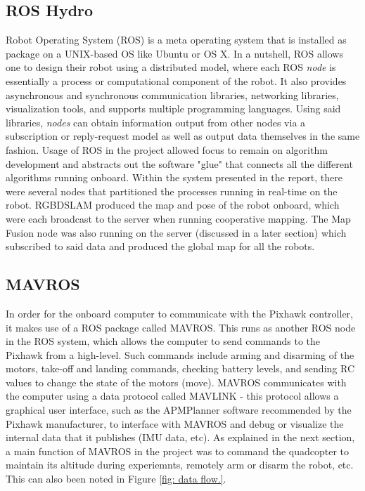 \documentclass[letterpaper, oneside, 10pt]{report}
\begin{document}
\subsection{ROS Hydro}
Robot Operating System (ROS) is a meta operating system that is installed as package on a UNIX-based OS like Ubuntu or OS X. In a nutshell, ROS allows one to design their robot using a distributed model, where each ROS \textsl{node} is essentially a process or computational component of the robot. It also provides asynchronous and synchronous communication libraries, networking libraries, visualization tools, and supports multiple programming languages. Using said libraries, \textsl{nodes} can obtain information output from other nodes via a subscription or reply-request model as well as output data themselves in the same fashion. Usage of ROS in the project allowed focus to remain on algorithm development and abstracts out the software "glue" that connects all the different algorithms running onboard. Within the system presented in the report, there were several nodes that partitioned the processes running in real-time on the robot. RGBDSLAM produced the map and pose of the robot onboard, which were each broadcast to the server when running cooperative mapping. The Map Fusion node was also running on the server (discussed in a later section) which subscribed to said data and produced the global map for all the robots.

\subsection{MAVROS}
In order for the onboard computer to communicate with the Pixhawk controller, it makes use of a ROS package called MAVROS. This runs as another ROS node in the ROS system, which allows the computer to send commands to the Pixhawk from a high-level. Such commands include arming and disarming of the motors, take-off and landing commands, checking battery levels, and sending RC values to change the state of the motors (move). MAVROS communicates with the computer using a data protocol called MAVLINK - this protocol allows a graphical user interface, such as the APMPlanner software recommended by the Pixhawk manufacturer, to interface with MAVROS and debug or visualize the internal data that it publishes (IMU data, etc). As explained in the next section, a main function of MAVROS in the project was to command the quadcopter to maintain its altitude during experiemnts, remotely arm or disarm the robot, etc. This can also been noted in Figure \ref{fig: data flow.}. \\
\end{document}
